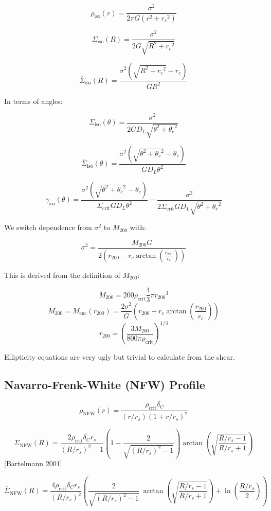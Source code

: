\documentclass[]{article}
\begin{document}
\[\rho_\mathrm{iso}(r) = \frac{\sigma^2}{2\pi G (r^2 + {r_c}^2)}\]

\[\Sigma_\mathrm{iso}(R) = \frac{\sigma^2}{2 G \sqrt{R^2 + {r_c}^2}}\]

\[\overline{\Sigma}_\mathrm{iso}(R) = \frac{\sigma^2 \left(\sqrt{R^2 + {r_c}^2} - r_c \right)}{G R^2}\]

In terms of angles:

\[\Sigma_\mathrm{iso}(\theta) = \frac{\sigma^2}{2 G D_L \sqrt{\theta^2 + {\theta_c}^2}}\]

\[\overline{\Sigma}_\mathrm{iso}(\theta) = \frac{\sigma^2 \left(\sqrt{\theta^2 + {\theta_c}^2} - \theta_c \right)}{G D_L \theta^2}\]

\[\gamma_\mathrm{iso}(\theta) = \frac{\sigma^2 \left(\sqrt{\theta^2 + {\theta_c}^2} - \theta_c \right)}{\Sigma_\mathrm{crit} G D_L \theta^2} - \frac{\sigma^2}{2 \Sigma_\mathrm{crit} G D_L \sqrt{\theta^2 + {\theta_c}^2}}\]

We switch dependence from $\sigma^2$ to $M_{200}$ with:

\[\sigma^2 = \frac{M_{200} G}{2 \left( r_{200} - r_c \arctan{\left(\frac{r_{200}}{r_c}\right)} \right)}\]

This is derived from the definition of $M_{200}$:

\[M_{200} = 200 \rho_\mathrm{crit} \frac{4}{3} \pi {r_{200}}^3\]
\[M_{200} = M_\mathrm{enc}(r_{200}) = \frac{2 \sigma^2}{G} \left( r_{200} - r_c \arctan{\left(\frac{r_{200}}{r_c}\right)} \right)\]
\[r_{200} = \left( \frac{3 M_{200}}{800 \pi \rho_\mathrm{crit}} \right)^{1/3}\]

Ellipticity equations are very ugly but trivial to calculate from the shear.



\subsection{Navarro-Frenk-White (NFW) Profile}

\[\rho_\mathrm{NFW}(r) = \frac{\rho_\mathrm{crit} \delta_C}{(r/r_s)\left(1 + r/r_s\right)^2}\]

\[\Sigma_\mathrm{NFW}(R) = \frac{2 \rho_\mathrm{crit} \delta_C r_s}{(R/r_s)^2 - 1} \left(1 - \frac{2}{\sqrt{(R/r_s)^2 - 1}} \right) \arctan\left(\sqrt{\frac{R/r_s - 1}{R/r_s + 1}} \right)\]
[Bartelmann 2001]

\[\overline{\Sigma}_\mathrm{NFW}(R) = \frac{4 \rho_\mathrm{crit} \delta_C r_s}{(R/r_s)^2} \left(
    \frac{2}{\sqrt{(R/r_s)^2 - 1}} ~\arctan\left(\sqrt{\frac{R/r_s - 1}{R/r_s + 1}} \right) + \ln{\left(\frac{R/r_s}{2}\right)}
\right)\]
\end{document}
